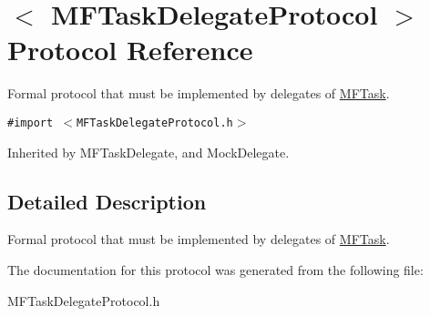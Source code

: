 \hypertarget{protocol_m_f_task_delegate_protocol-p}{
\section{$<$ MFTaskDelegateProtocol $>$ Protocol Reference}
\label{protocol_m_f_task_delegate_protocol-p}
}
Formal protocol that must be implemented by delegates of \hyperlink{interface_m_f_task}{MFTask}.  


{\tt \#import $<$MFTaskDelegateProtocol.h$>$}

Inherited by MFTaskDelegate, and MockDelegate.



\subsection{Detailed Description}
Formal protocol that must be implemented by delegates of \hyperlink{interface_m_f_task}{MFTask}. 

The documentation for this protocol was generated from the following file:\begin{CompactItemize}
\item 
MFTaskDelegateProtocol.h\end{CompactItemize}
